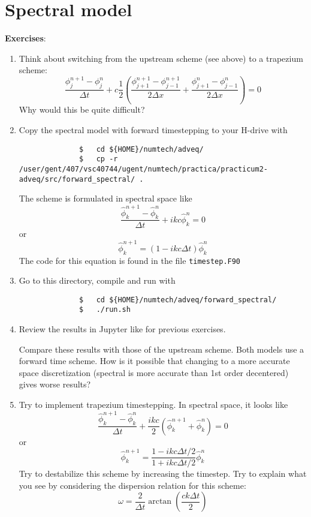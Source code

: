 \documentclass[a4paper]{article}
\begin{document}
\section{Spectral model}
%
\textbf{Exercises}:
%
\begin{enumerate}
	\item Think about switching from the upstream scheme (see above) to a trapezium scheme:
		\begin{equation*}
			\frac{\phi^{n+1}_{j}-\phi^{n}_{j}}{\Delta t}+c\frac{1}{2}\left(\frac{\phi^{n+1}_{j+1}-\phi^{n+1}_{j-1}}{2\Delta x}+\frac{\phi^{n}_{j+1}-\phi^{n}_{j-1}}{2\Delta x}\right)=0
		\end{equation*}
		Why would this be quite difficult?
	\item Copy the spectral model with forward timestepping to your H-drive with
		\begin{verbatim}
			  $   cd ${HOME}/numtech/adveq/ 
			  $   cp -r /user/gent/407/vsc40744/ugent/numtech/practica/practicum2-adveq/src/forward_spectral/ .
		\end{verbatim}
		The scheme is formulated in spectral space like
		\begin{equation*}
			\frac{\hat\phi_k^{n+1}-\hat\phi_k^{n}}{\Delta t}+ikc\hat\phi_k^n=0
		\end{equation*}
		or
		\begin{equation*}
			\hat\phi_k^{n+1}=(1-ikc\Delta t)\hat\phi_k^n
		\end{equation*}
		The code for this equation is found in the file \verb+timestep.F90+
	\item Go to this directory, compile and run with
		\begin{verbatim}
			  $   cd ${HOME}/numtech/adveq/forward_spectral/
			  $   ./run.sh
		\end{verbatim}
	\item Review the results in Jupyter like for previous exercises.
		\par
Compare these results with those of the upstream scheme. Both models use a forward time scheme. How is it possible that changing to a more accurate space discretization (spectral is more accurate than 1st order decentered) gives worse results?
	\item Try to implement trapezium timestepping. In spectral space, it looks like
		\begin{equation*}
			\frac{\hat\phi^{n+1}_{k}-\hat\phi^{n}_{k}}{\Delta t}+\frac{ikc}{2}\left(\hat\phi^{n+1}_{k}+\hat\phi^{n}_{k}\right)=0
		\end{equation*}
		or
		\begin{equation*}
			\hat\phi^{n+1}_{k}=\frac{1-ikc\Delta t/2}{1+ikc\Delta t/2}\hat\phi_k^n
		\end{equation*}
		Try to destabilize this scheme by increasing the timestep. Try to explain what you see by considering the dispersion relation for this scheme:
		\begin{equation*}
			\omega=\frac{2}{\Delta t}\arctan\left(\frac{ck\Delta t}{2}\right)
		\end{equation*}
\end{enumerate}
%
\end{document}
